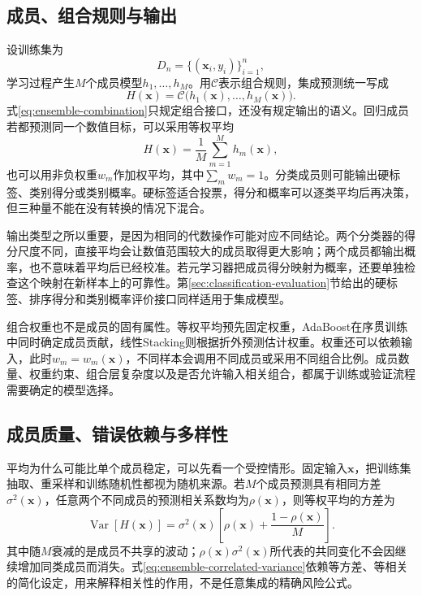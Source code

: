 \subsection{成员、组合规则与输出}
\label{sec:ensemble-members-combination-output}

设训练集为
\[
  D_n=\{(\bm{x}_i,y_i)\}_{i=1}^{n},
\]
学习过程产生$M$个成员模型$h_1,\ldots,h_M$。用$\mathcal{C}$表示组合规则，集成预测统一写成
\begin{equation}
  H(\bm{x})
  =\mathcal{C}\bigl(h_1(\bm{x}),\ldots,h_M(\bm{x})\bigr).
  \label{eq:ensemble-combination}
\end{equation}
式\eqref{eq:ensemble-combination}只规定组合接口，还没有规定输出的语义。回归成员若都预测同一个数值目标，可以采用等权平均
\[
  H(\bm{x})=\frac{1}{M}\sum_{m=1}^{M}h_m(\bm{x}),
\]
也可以用非负权重$w_m$作加权平均，其中$\sum_m w_m=1$。分类成员则可能输出硬标签、类别得分或类别概率。硬标签适合投票，得分和概率可以逐类平均后再决策，但三种量不能在没有转换的情况下混合。

输出类型之所以重要，是因为相同的代数操作可能对应不同结论。两个分类器的得分尺度不同，直接平均会让数值范围较大的成员取得更大影响；两个成员都输出概率，也不意味着平均后已经校准。若元学习器把成员得分映射为概率，还要单独检查这个映射在新样本上的可靠性。第\ref{sec:classification-evaluation}节给出的硬标签、排序得分和类别概率评价接口同样适用于集成模型。

组合权重也不是成员的固有属性。等权平均预先固定权重，AdaBoost在序贯训练中同时确定成员贡献，线性Stacking则根据折外预测估计权重。权重还可以依赖输入，此时$w_m=w_m(\bm{x})$，不同样本会调用不同成员或采用不同组合比例。成员数量、权重约束、组合层复杂度以及是否允许输入相关组合，都属于训练或验证流程需要确定的模型选择。

\subsection{成员质量、错误依赖与多样性}
\label{sec:ensemble-quality-dependence-diversity}

平均为什么可能比单个成员稳定，可以先看一个受控情形。固定输入$\bm{x}$，把训练集抽取、重采样和训练随机性都视为随机来源。若$M$个成员预测具有相同方差$\sigma^2(\bm{x})$，任意两个不同成员的预测相关系数均为$\rho(\bm{x})$，则等权平均的方差为
\begin{equation}
  \operatorname{Var}\!\left[H(\bm{x})\right]
  =
  \sigma^2(\bm{x})
  \left[
    \rho(\bm{x})
    +
    \frac{1-\rho(\bm{x})}{M}
  \right].
  \label{eq:ensemble-correlated-variance}
\end{equation}
其中随$M$衰减的是成员不共享的波动；$\rho(\bm{x})\sigma^2(\bm{x})$所代表的共同变化不会因继续增加同类成员而消失。式\eqref{eq:ensemble-correlated-variance}依赖等方差、等相关的简化设定，用来解释相关性的作用，不是任意集成的精确风险公式。

